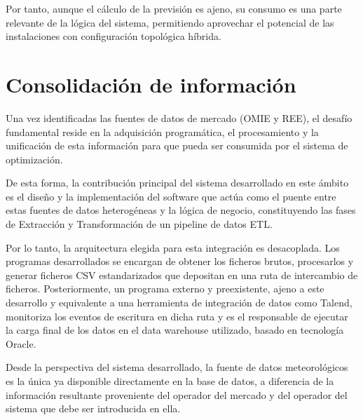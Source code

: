 Por tanto, aunque el cálculo de la previsión es ajeno, su consumo es una parte relevante de la lógica del sistema, permitiendo aprovechar el potencial de las instalaciones con configuración topológica híbrida.

\section{Consolidación de información}
\label{makereference4.4}

Una vez identificadas las fuentes de datos de mercado (OMIE y REE), el desafío fundamental reside en la adquisición programática, el procesamiento y la unificación de esta información para que pueda ser consumida por el sistema de optimización.

De esta forma, la contribución principal del sistema desarrollado en este ámbito es el diseño y la implementación del software que actúa como el puente entre estas fuentes de datos heterogéneas y la lógica de negocio, constituyendo las fases de Extracción y Transformación de un pipeline de datos ETL.

Por lo tanto, la arquitectura elegida para esta integración es desacoplada. Los programas desarrollados se encargan de obtener los ficheros brutos, procesarlos y generar ficheros CSV estandarizados que depositan en una ruta de intercambio de ficheros. Posteriormente, un programa externo y preexistente, ajeno a este desarrollo y equivalente a una herramienta de integración de datos como Talend, monitoriza los eventos de escritura en dicha ruta y es el responsable de ejecutar la carga final de los datos en el data warehouse utilizado, basado en tecnología Oracle.

Desde la perspectiva del sistema desarrollado, la fuente de datos meteorológicos es la única ya disponible directamente en la base de datos, a diferencia de la información resultante proveniente del operador del mercado y del operador del sistema que debe ser introducida en ella.

